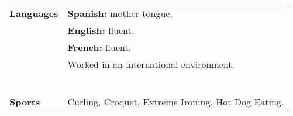 \documentclass[twoside,a4paper,openright,10pt]{report}
\newcommand{\header}[1]{\multicolumn{2}{c}{\cellcolor{black} \textcolor{white}{#1}}\\}
\begin{document}
\begin{table}[ht]
\begin{tabular}{p{40mm} p{140mm}}
\textbf{Languages} & \textbf{Spanish:} mother tongue.\\
& \textbf{English:} fluent.\\
& \textbf{French:} fluent.\\
& Worked in an international environment.

\\
\header{Interests and Activities} \\

\textbf{Sports} & Curling, Croquet, Extreme Ironing, Hot Dog Eating.\\

\end{tabular}
\end{table}
\end{document}
